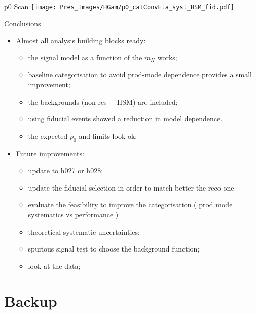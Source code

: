\documentclass[10pt,UKenglish, leqno, xcolor = dvipsnames]{beamer}
\begin{document}
	\begin{frame}{p0 Scan}
		\centering
		\texttt{[image: Pres\_Images/HGam/p0\_catConvEta\_syst\_HSM\_fid.pdf]}
	\end{frame}
	
	\begin{frame}{Conclusions}
		\vfill
		\begin{itemize}
			\item Almost all analysis building blocks ready:
			\begin{itemize}
				\item the signal model as a function of the $m_H$ works;
				\item baseline categorisation to avoid prod-mode dependence provides a small improvement;
				\item the backgrounds (non-res + HSM) are included;
				\item using fiducial events showed a reduction in model dependence.
				\item the expected $p_0$ and limits look ok;
			\end{itemize}
			\item Future improvements:
			\begin{itemize}
				\item update to h027 or h028;
				\item update the fiducial selection in order to match better the reco one
				\item evaluate the feasibility to improve the categorisation ( prod mode systematics vs performance )
				\item theoretical systematic uncertainties;
				\item spurious signal test to choose the background function;
				\item look at the data;
			\end{itemize}
		\end{itemize}
		\vfill
	\end{frame}
	
	\section{Backup}
	\SectionPage
	
\end{document}

